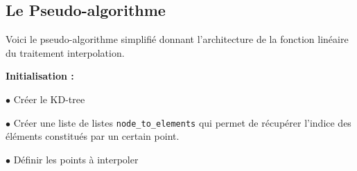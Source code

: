 \newpage
\subsection{Le Pseudo-algorithme}


Voici le pseudo-algorithme simplifié donnant l'architecture de la fonction linéaire du traitement interpolation.

\vspace{0.5cm}

\textbf{Initialisation :}

$\bullet$ Créer le KD-tree

$\bullet$ Créer une liste de listes \texttt{node\_to\_elements} qui permet de récupérer l'indice des éléments constitués par un certain point.

$\bullet$ Définir les points à interpoler

\vspace{0.5cm}

